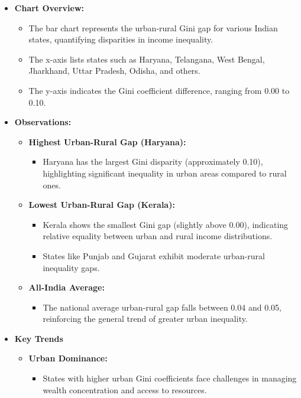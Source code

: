\documentclass{article}
\begin{document}
	\begin{itemize}
		\item \textbf{Chart Overview:}
		\begin{itemize}
			\item The bar chart represents the urban-rural Gini gap for various Indian states, quantifying disparities in income inequality.
			\item The x-axis lists states such as Haryana, Telangana, West Bengal, Jharkhand, Uttar Pradesh, Odisha, and others.
			\item The y-axis indicates the Gini coefficient difference, ranging from 0.00 to 0.10.
		\end{itemize}
		
		\item \textbf{Observations:}
		\begin{itemize}
			\item \textbf{Highest Urban-Rural Gap (Haryana):}
			\begin{itemize}
				\item Haryana has the largest Gini disparity (approximately 0.10), highlighting significant inequality in urban areas compared to rural ones.
			\end{itemize}
			
			\item \textbf{Lowest Urban-Rural Gap (Kerala):}
			\begin{itemize}
				\item Kerala shows the smallest Gini gap (slightly above 0.00), indicating relative equality between urban and rural income distributions.
				\item States like Punjab and Gujarat exhibit moderate urban-rural inequality gaps.
			\end{itemize}
			
			\item \textbf{All-India Average:}
			\begin{itemize}
				\item The national average urban-rural gap falls between 0.04 and 0.05, reinforcing the general trend of greater urban inequality.
			\end{itemize}
		\end{itemize}
		
		\item \textbf{Key Trends}
		\begin{itemize}
			\item \textbf{Urban Dominance:}
			\begin{itemize}
				\item States with higher urban Gini coefficients face challenges in managing wealth concentration and access to resources.
			\end{itemize}
			

\end{itemize}
\end{itemize}
\end{document}
